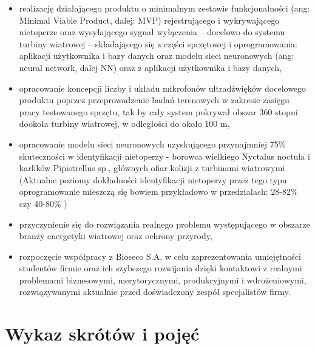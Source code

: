 \documentclass{sprz}
\begin{document}
\begin{itemize}
  \item{realizację działającego produktu o minimalnym zestawie funkcjonalności (ang: Minimal Viable Product, dalej: MVP) rejestrującego i wykrywającego nietoperze oraz wysyłającego sygnał wyłączenia – docelowo do systemu turbiny wiatrowej – składającego się z części sprzętowej i oprogramowania: aplikacji użytkownika i bazy danych oraz modelu sieci neuronowych (ang: neural network, dalej NN) oraz z aplikacji użytkownika i bazy danych,}
  \item{opracowanie koncepcji liczby i układu mikrofonów ultradźwięków docelowego produktu poprzez przeprowadzenie badań terenowych w zakresie zasięgu pracy testowanego sprzętu, tak by cały system pokrywał obszar 360 stopni dookoła turbiny wiatrowej, w odległości do około 100 m,}
  \item{opracowanie modelu sieci neuronowych uzyskującego przynajmniej 75\% skuteczności w identyfikacji nietoperzy - borowca wielkiego Nyctalus noctula i karlików Pipistrellus sp., głównych ofiar kolizji z turbinami wiatrowymi (Aktualne poziomy dokładności identyfikacji nietoperzy przez tego typu oprogramowanie mieszczą się bowiem przykładowo w przedziałach: 28-82\% \cite{kaleidoscope-accuracy} czy 40-80\% \cite{kaleidoscope-bias})}
  \item{przyczynienie się do rozwiązania realnego problemu występującego w obszarze branży energetyki wiatrowej oraz ochrony przyrody,}
  \item{rozpoczęcie współpracy z Bioseco S.A. w celu zaprezentowania umiejętności studentów firmie oraz ich szybszego rozwijania dzięki kontaktowi z realnymi problemami biznesowymi, merytorycznymi, produkcyjnymi i wdrożeniowymi, rozwiązywanymi aktualnie przed doświadczony zespół specjalistów firmy.}
\end{itemize}

\section{Wykaz skrótów i pojęć}
\end{document}
